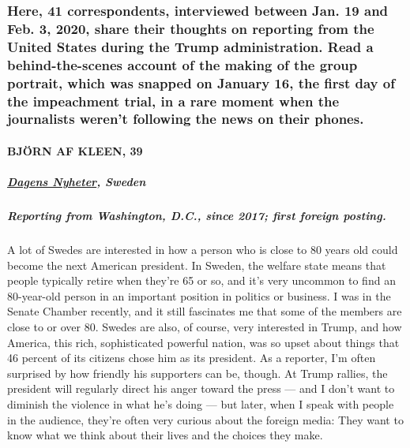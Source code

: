 \hypertarget{here-41-correspondents-interviewed-between-jan-19-and-feb-3-2020-share-their-thoughts-on-reporting-from-the-united-states-during-the-trump-administration-read-a-behind-the-scenes-account-of-the-making-of-the-group-portrait-which-was-snapped-on-january-16-the-first-day-of-the-impeachment-trial-in-a-rare-moment-when-the-journalists-werent-following-the-news-on-their-phones}{%
\subsubsection{Here, 41 correspondents, interviewed between Jan. 19 and
Feb. 3, 2020, share their thoughts on reporting from the United States
during the Trump administration. Read a behind-the-scenes account of the
making of the group portrait, which was snapped on January 16, the first
day of the impeachment trial, in a rare moment when the journalists
weren't following the news on their
phones.}\label{here-41-correspondents-interviewed-between-jan-19-and-feb-3-2020-share-their-thoughts-on-reporting-from-the-united-states-during-the-trump-administration-read-a-behind-the-scenes-account-of-the-making-of-the-group-portrait-which-was-snapped-on-january-16-the-first-day-of-the-impeachment-trial-in-a-rare-moment-when-the-journalists-werent-following-the-news-on-their-phones}}

\hypertarget{bjuxf6rn-af-kleen-39}{%
\paragraph{BJÖRN AF KLEEN, 39}\label{bjuxf6rn-af-kleen-39}}

\hypertarget{dagens-nyheter-sweden}{%
\subparagraph{\texorpdfstring{\textbf{\href{https://www.dn.se/}{Dagens
Nyheter},
Sweden}}{Dagens Nyheter, Sweden}}\label{dagens-nyheter-sweden}}

\hypertarget{reporting-from-washington-dc-since-2017-first-foreign-posting}{%
\subparagraph{\texorpdfstring{\textbf{Reporting from Washington, D.C.,
since 2017; first foreign
posting.}}{Reporting from Washington, D.C., since 2017; first foreign posting.}}\label{reporting-from-washington-dc-since-2017-first-foreign-posting}}

A lot of Swedes are interested in how a person who is close to 80 years
old could become the next American president. In Sweden, the welfare
state means that people typically retire when they're 65 or so, and it's
very uncommon to find an 80-year-old person in an important position in
politics or business. I was in the Senate Chamber recently, and it still
fascinates me that some of the members are close to or over 80. Swedes
are also, of course, very interested in Trump, and how America, this
rich, sophisticated powerful nation, was so upset about things that 46
percent of its citizens chose him as its president. As a reporter, I'm
often surprised by how friendly his supporters can be, though. At Trump
rallies, the president will regularly direct his anger toward the press
--- and I don't want to diminish the violence in what he's doing --- but
later, when I speak with people in the audience, they're often very
curious about the foreign media: They want to know what we think about
their lives and the choices they make.

